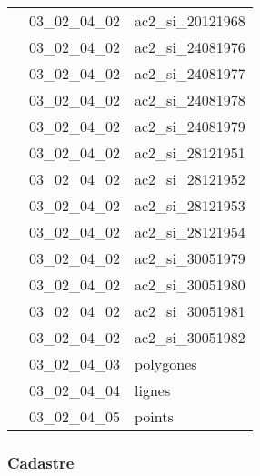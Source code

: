 \documentclass[12pt,titlepage,oneside]{book}
\begin{document}
\begin{supertabular}{|p{10cm}|c|p{15cm}|}
                    & 03\_02\_04\_02 & ac2\_si\_20121968\\


                    & 03\_02\_04\_02 & ac2\_si\_24081976\\


                    & 03\_02\_04\_02 & ac2\_si\_24081977\\


                    & 03\_02\_04\_02 & ac2\_si\_24081978\\


                    & 03\_02\_04\_02 & ac2\_si\_24081979\\


                    & 03\_02\_04\_02 & ac2\_si\_28121951\\


                    & 03\_02\_04\_02 & ac2\_si\_28121952\\


                    & 03\_02\_04\_02 & ac2\_si\_28121953\\


                    & 03\_02\_04\_02 & ac2\_si\_28121954\\


                    & 03\_02\_04\_02 & ac2\_si\_30051979\\


                    & 03\_02\_04\_02 & ac2\_si\_30051980\\


                    & 03\_02\_04\_02 & ac2\_si\_30051981\\


                    & 03\_02\_04\_02 & ac2\_si\_30051982\\


                    & 03\_02\_04\_03 & polygones\\


                    & 03\_02\_04\_04 & lignes\\


                    & 03\_02\_04\_05 & points\\
\hline
\end{supertabular}

\subsubsection{\large Cadastre}
\end{document}
